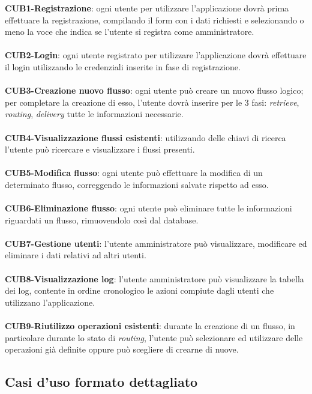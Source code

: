 \textbf{CUB1-Registrazione}: ogni utente per utilizzare l'applicazione dovrà prima effettuare la registrazione, compilando il form con i dati richiesti e selezionando o meno la voce che indica se l'utente si registra come amministratore.\\
 \\
\textbf{CUB2-Login}: ogni utente registrato per utilizzare l'applicazione dovrà effettuare il login utilizzando le credenziali inserite in fase di registrazione.\\
 \\
\textbf{CUB3-Creazione nuovo flusso}: ogni utente può creare un nuovo flusso logico; per completare la creazione di esso, l'utente dovrà inserire per le 3 fasi: \textit{retrieve}, \textit{routing}, \textit{delivery} tutte le informazioni necessarie.\\
 \\
\textbf{CUB4-Visualizzazione flussi esistenti}: utilizzando delle chiavi di ricerca l'utente può ricercare e visualizzare i flussi presenti.\\
 \\
\textbf{CUB5-Modifica flusso}: ogni utente può effettuare la modifica di un determinato flusso, correggendo le informazioni salvate rispetto ad esso.\\
 \\
\textbf{CUB6-Eliminazione flusso}: ogni utente può eliminare tutte le informazioni riguardati un flusso, rimuovendolo così dal database.\\
 \\
\textbf{CUB7-Gestione utenti}: l'utente amministratore può visualizzare, modificare ed eliminare i dati relativi ad altri utenti.\\
 \\
\textbf{CUB8-Visualizzazione log}: l'utente amministratore può visualizzare la tabella dei \gls{log}, contente in ordine cronologico le azioni compiute dagli utenti che utilizzano l'applicazione.\\
 \\
\textbf{CUB9-Riutilizzo operazioni esistenti}: durante la creazione di un flusso, in particolare durante lo stato di \textit{routing}, l'utente può selezionare ed utilizzare delle operazioni già definite oppure può scegliere di crearne di nuove.
\subsection{Casi d'uso formato dettagliato}

